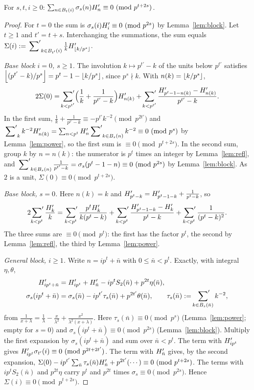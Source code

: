 \documentclass[11pt]{amsart}
\begin{document}
\begin{lemma}\label{lem:dh1}
For $s,t,i\ge0$: $\sum_{n\in B_t(i)}\sigma_s(n)H'_n\equiv0\ (\mathrm{mod}\ p^{t+2s})$.
\end{lemma}
\begin{proof}
For $t=0$ the sum is $\sigma_s(i)H'_i\equiv0\ (\mathrm{mod}\ p^{2s})$ by Lemma~\ref{lem:block}. Let $t\ge1$ and $t'=t+s$. Interchanging the summations, the sum equals $\Sigma(i):=\sideset{}{'}\sum_{k\in B_{t'}(i)}\frac1kH'_{\left\lfloor k/p^s\right\rfloor}$.

\emph{Base block $i=0$, $s\ge1$.} The involution $k\mapsto p^{t'}-k$ of the units below $p^{t'}$ satisfies $\left\lfloor (p^{t'}-k)/p^s\right\rfloor=p^t-1-\left\lfloor k/p^s\right\rfloor$, since $p^s\nmid k$. With $n(k)=\left\lfloor k/p^s\right\rfloor$,
\[ 2\Sigma(0)=\sideset{}{'}\sum_{k<p^{t'}}\Bigl(\frac1k+\frac1{p^{t'}-k}\Bigr)H'_{n(k)}+\sideset{}{'}\sum_{k<p^{t'}}\frac{H'_{p^t-1-n(k)}-H'_{n(k)}}{p^{t'}-k}. \]
In the first sum, $\frac1k+\frac1{p^{t'}-k}\equiv-p^{t'}k^{-2}\pmod{p^{2t'}}$ and $\sideset{}{'}\sum_kk^{-2}H'_{n(k)}=\sum_{n<p^t}H'_n\sideset{}{'}\sum_{k\in B_s(n)}k^{-2}\equiv0\ (\mathrm{mod}\ p^s)$ by Lemma~\ref{lem:power}, so the first sum is $\equiv0\pmod{p^{t+2s}}$. In the second sum, group $k$ by $n=n(k)$: the numerator is $p^t$ times an integer by Lemma~\ref{lem:refl}, and $\sideset{}{'}\sum_{k\in B_s(n)}\frac1{p^{t'}-k}=\sigma_s(p^t-1-n)\equiv0\ (\mathrm{mod}\ p^{2s})$ by Lemma~\ref{lem:block}. As $2$ is a unit, $\Sigma(0)\equiv0\pmod{p^{t+2s}}$.

\emph{Base block, $s=0$.} Here $n(k)=k$ and $H'_{p^t-k}=H'_{p^t-1-k}+\frac1{p^t-k}$, so
\[ 2\sideset{}{'}\sum_{k<p^t}\frac{H'_k}k=\sideset{}{'}\sum_{k<p^t}\frac{p^tH'_k}{k(p^t-k)}+\sideset{}{'}\sum_{k<p^t}\frac{H'_{p^t-1-k}-H'_k}{p^t-k}+\sideset{}{'}\sum_{k<p^t}\frac1{(p^t-k)^2}. \]
The three sums are $\equiv0\pmod{p^t}$: the first has the factor $p^t$, the second by Lemma~\ref{lem:refl}, the third by Lemma~\ref{lem:power}.

\emph{General block, $i\ge1$.} Write $n=ip^t+\bar n$ with $0\le\bar n<p^t$. Exactly, with integral $\eta,\theta$,
\begin{align*}
H'_{ip^t+\bar n}&=H'_{ip^t}+H'_{\bar n}-ip^tS_2(\bar n)+p^{2t}\eta(\bar n),\\
\sigma_s(ip^t+\bar n)&=\sigma_s(\bar n)-ip^{t'}\tau_s(\bar n)+p^{2t'}\theta(\bar n),\qquad \tau_s(\bar n):=\sideset{}{'}\sum_{k\in B_s(\bar n)}k^{-2},
\end{align*}
from $\frac1{x+\lambda}=\frac1\lambda-\frac x{\lambda^2}+\frac{x^2}{\lambda^2(x+\lambda)}$. Here $\tau_s(\bar n)\equiv0\pmod{p^s}$ (Lemma~\ref{lem:power}; empty for $s=0$) and $\sigma_s(ip^t+\bar n)\equiv0\pmod{p^{2s}}$ (Lemma~\ref{lem:block}). Multiply the first expansion by $\sigma_s(ip^t+\bar n)$ and sum over $\bar n<p^t$. The term with $H'_{ip^t}$ gives $H'_{ip^t}\sigma_{t'}(i)\equiv0\ (\mathrm{mod}\ p^{2t+2t'})$. The term with $H'_{\bar n}$ gives, by the second expansion, $\Sigma(0)-ip^{t'}\sum_{\bar n}\tau_s(\bar n)H'_{\bar n}+p^{2t'}(\cdots)\equiv0\ (\mathrm{mod}\ p^{t+2s})$. The terms with $ip^tS_2(\bar n)$ and $p^{2t}\eta$ carry $p^t$ and $p^{2t}$ times $\sigma_s\equiv0\pmod{p^{2s}}$. Hence $\Sigma(i)\equiv0\pmod{p^{t+2s}}$.
\end{proof}
\end{document}
